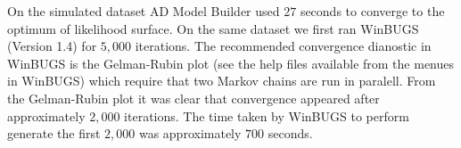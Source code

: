 \documentclass[10tp]{article}
\begin{document}
On the simulated dataset AD Model Builder used $27$ seconds to converge to
the optimum of likelihood surface. On the same dataset we first ran WinBUGS
(Version 1.4) for $5,000$ iterations. The recommended convergence dianostic
in WinBUGS is the Gelman-Rubin plot (see the help files available from the
menues in WinBUGS) which require that two Markov chains are run in paralell.
From the Gelman-Rubin plot it was clear that convergence appeared after
approximately $2,000$ iterations. The time taken by WinBUGS to perform
generate the first $2,000$ was approximately $700$ seconds.
\end{document}
